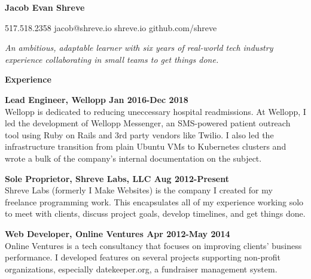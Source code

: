 \documentclass[10pt,letter]{article}
\begin{document}
\hspace*{-1.1in}

\vspace*{-0.25in}
\textbf{\Huge Jacob Evan Shreve}

\vspace{0.25in}

{517.518.2358 \hspace{0.3in} jacob@shreve.io \hspace{0.3in} shreve.io \hspace{0.3in} github.com/shreve}
\vspace{0.25in}

\textit{\large{
An ambitious, adaptable learner with six years of real-world tech industry experience
collaborating in small teams to get things done.
}}
\vspace{0.25in}

{\LARGE\textbf{Experience}}
\vspace{0.15in}

\textbf{Lead Engineer, Wellopp \hfill Jan 2016-Dec 2018}\\
Wellopp is dedicated to reducing uneccessary hospital readmissions. At Wellopp, I led
the development of Wellopp Messenger, an SMS-powered patient outreach tool using Ruby on Rails
and 3rd party vendors like Twilio. I also led the infrastructure transition from plain Ubuntu VMs to Kubernetes clusters and wrote a bulk of the company's internal documentation on the subject.
\vspace{0.25in}

\textbf{Sole Proprietor, Shreve Labs, LLC \hfill Aug 2012-Present}\\
Shreve Labs (formerly I Make Websites) is the company I created for my freelance programming work. This
encapsulates all of my experience working solo to meet with clients, discuss project goals,
develop timelines, and get things done.
\vspace{0.25in}

\textbf{Web Developer, Online Ventures \hfill Apr 2012-May 2014}\\
Online Ventures is a tech consultancy that focuses on improving clients’ business performance.
I developed features on several projects supporting non-profit organizations,
especially datekeeper.org, a fundraiser management system.
\end{document}
